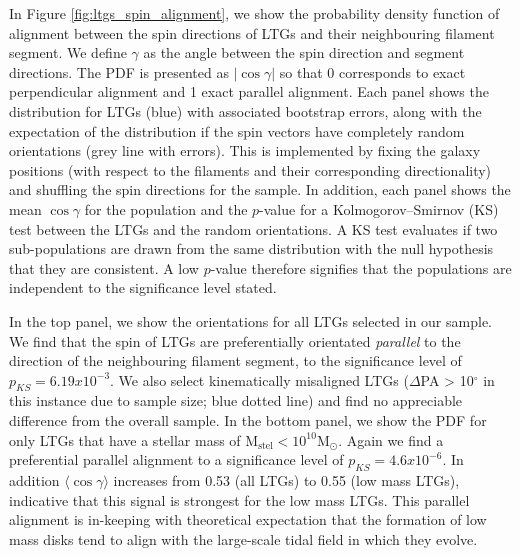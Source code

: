 In Figure \ref{fig:ltgs_spin_alignment}, we show the probability density function of alignment between the spin directions of LTGs and their neighbouring filament segment. We define $\gamma$ as the angle between the spin direction and segment directions. The PDF is presented as $|\cos \gamma|$ so that 0 corresponds to exact perpendicular alignment and 1 exact parallel alignment. Each panel shows the distribution for LTGs (blue) with associated bootstrap errors, along with the expectation of the distribution if the spin vectors have completely random orientations (grey line with errors). This is implemented by fixing the galaxy positions (with respect to the filaments and their corresponding directionality) and shuffling the spin directions for the sample. In addition, each panel shows the mean $\cos \gamma$ for the population and the $p$-value for a Kolmogorov--Smirnov (KS) test between the LTGs and the random orientations. A KS test evaluates if two sub-populations are drawn from the same distribution with the null hypothesis that they are consistent. A low $p$-value therefore signifies that the populations are independent to the significance level stated. 

In the top panel, we show the orientations for all LTGs selected in our sample. We find that the spin of LTGs are preferentially orientated \textit{parallel} to the direction of the neighbouring filament segment, to the significance level of $p_{KS} = 6.19 x 10^{-3}$. We also select kinematically misaligned LTGs ($\Delta$PA > 10$^{\circ}$ in this instance due to sample size; blue dotted line) and find no appreciable difference from the overall sample. In the bottom panel, we show the PDF for only LTGs that have a stellar mass of $\mathrm{M_{stel} < 10^{10} M_{\odot}}$. Again we find a preferential parallel alignment to a significance level of $p_{KS} = 4.6 x 10^{-6}$. In addition $\langle \cos \gamma \rangle$ increases from 0.53 (all LTGs) to 0.55 (low mass LTGs), indicative that this signal is strongest for the low mass LTGs. This parallel alignment is in-keeping with theoretical expectation that the formation of low mass disks tend to align with the large-scale tidal field in which they evolve. 

